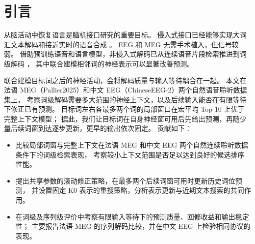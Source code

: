 \section{引言}

从脑活动中恢复语言是脑机接口研究的重要目标。
侵入式接口已经能够实现大词汇文本解码和接近实时的语音合成
\cite{moses2021neuroprosthesis,willett2023speech,card2024speech,wairagkar2025voice}。
EEG 和 MEG 无需手术植入，但信号较弱。
借助预训练语音和语言模型，非侵入式解码已从连续语音片段检索推进到词级解码
\cite{defossez2023decoding,dascoli2025word}，
其中联合建模相邻词的神经表示可以显著改善预测\cite{dascoli2025word}。

联合建模目标词之后的神经活动，会将解码质量与输入等待耦合在一起。
本文在法语 MEG（Pallier2025）和中文 EEG（ChineseEEG-2）两个自然语音聆听数据集上，
考察词级解码需要多大范围的神经上下文，以及后续输入能否在有限等待下修正已有预测。
目标词左右各最多两个词的局部窗口在宏平均 Top-$10$ 上优于完整上下文模型；
据此，我们让目标词在自身神经窗可用后先给出预测，再随少量后续词窗到达逐步更新，更早的输出依次固定。
贡献如下：
\begin{itemize}
    \item 比较局部词窗与完整上下文在法语 MEG 和中文 EEG 两个自然连续聆听数据条件下的词级检索表现，
          考察较小上下文范围是否足以达到良好的候选排序性能。
    \item 提出共享参数的滚动修正策略，在最多两个后续词窗可用时更新历史词位预测，
          并设置固定 K0 表示的重搜策略，分析表示更新与近期文本搜索的共同作用。
    \item 在词级及序列级评价中考察有限输入等待下的预测质量、回修收益和输出稳定性；
          主要报告法语 MEG 的序列解码比较，并在中文 EEG 上检验相同协议的表现。
\end{itemize}
